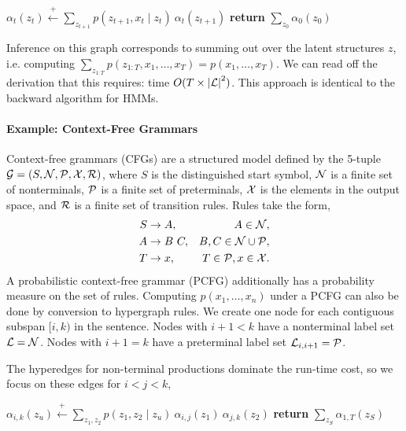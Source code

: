 \documentclass{article}
\begin{document}
\begin{algorithm}
\begin{algorithmic} 
\STATE $\alpha_t(z_t) \stackrel{+}{\gets}  \displaystyle \sum_{z_{t+1}}  p(z_{t+1}, x_t \mid z_{t}) \  \alpha_{t}(z_{t+1})$
\ENDFOR
\ENDFOR
\STATE \textbf{return} $\sum_{z_0} \alpha_0(z_0)$
\end{algorithmic} 
\end{algorithm}




Inference on this graph corresponds to summing out over the latent structures $z$, i.e. 
computing $\sum_{z_{1:T}} p(z_{1:T}, x_1, \ldots, x_T) = p(x_1, \ldots, x_T)$. We 
can read off the derivation that this requires: time $O(T \times {|\cal L|}^2)$. This approach is identical to the backward algorithm for HMMs.

\paragraph{Example: Context-Free Grammars}


Context-free grammars (CFGs) are a structured model defined by the 5-tuple 
$\mathcal{G} = (S,\mathcal{N},\mathcal{P},\mathcal{X},\mathcal{R})$, where $S$ is the distinguished start symbol, $\mathcal{N}$ is a finite set of nonterminals, $\mathcal{P}$ is a finite set of preterminals, $\mathcal{X}$ is the elements in the output space, and $\mathcal{R}$ is a finite set of transition rules.
Rules take the form,
\begin{equation}
\label{eqn:pcfg-rules}
\begin{aligned}
S&\to A, & A\in\mathcal{N},\\
A&\to B\ C, & B,C\in\mathcal{N}\cup\mathcal{P},\\
T&\to x, & T \in\mathcal{P},x\in\mathcal{X}.
\end{aligned}
\end{equation}
A probabilistic context-free grammar (PCFG) additionally has a probability measure on the set of rules.
Computing $p(x_1, \ldots, x_n)$ under a PCFG can also be done by
conversion to hypergraph rules. We create one node for each contiguous
 subspan $[i, k)$ in the sentence. Nodes with $i + 1 < k$ have a
nonterminal label set ${\cal L} = \mathcal{N}$. Nodes with $i + 1= k $ have a 
preterminal label set ${\cal L}_{i,i+1} = \mathcal{P}$. 

The hyperedges for non-terminal productions dominate 
the run-time cost, so we focus on these edges for $i < j < k$,
\begin{algorithm}
\begin{algorithmic} 
\ENDFOR
{}
\STATE $\alpha_{i,k}(z_{u}) \stackrel{+}{\gets} \displaystyle \sum_{z_1, z_2}  p(z_1, z_2 \mid z_{u}) \  \alpha_{i, j}(z_1)\ \alpha_{j,k}(z_2)$
\ENDFOR
\ENDFOR
\STATE \textbf{return} $\sum_{z_S} \alpha_{1,T}(z_S)$
\end{algorithmic} 
\end{algorithm}
\end{document}
